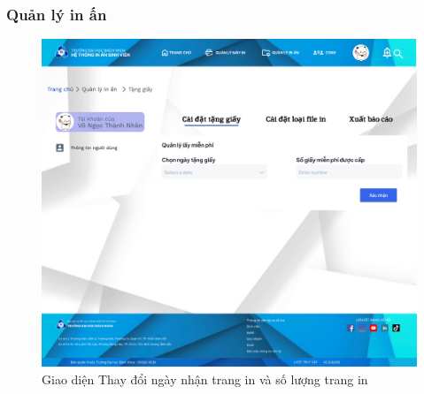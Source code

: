 \subsubsection{Quản lý in ấn}
\begin{figure}[H]
    \begin{center}
        \includegraphics[width=1\textwidth]{Images/Figma/Cài đặt tặng giấy.png}
        \caption{Giao diện Thay đổi ngày nhận trang in và số lượng trang in}
        \label{fig:arch}
    \end{center}
\end{figure}
